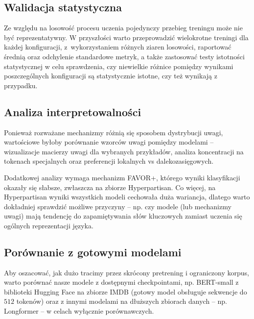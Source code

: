 \documentclass[a4paper,11pt,twoside]{report}
\theoremstyle{definition}
\begin{document}
\subsection{Walidacja statystyczna} 
Ze względu na losowość procesu uczenia pojedynczy przebieg treningu może nie być reprezentatywny. W przyszłości warto przeprowadzić wielokrotne treningi dla każdej konfiguracji, z~wykorzystaniem różnych ziaren losowości, raportować średnią oraz odchylenie standardowe metryk, a także zastosować testy istotności statystycznej w celu sprawdzenia, czy niewielkie różnice pomiędzy wynikami poszczególnych konfiguracji są statystycznie istotne, czy też wynikają z przypadku.

\subsection{Analiza interpretowalności}
Ponieważ rozważane mechanizmy różnią się sposobem dystrybucji uwagi, wartościowe byłoby porównanie wzorców uwagi pomiędzy modelami -- wizualizacje macierzy uwagi dla wybranych przykładów, analiza koncentracji na tokenach specjalnych oraz preferencji lokalnych vs dalekozasięgowych.

Dodatkowej analizy wymaga mechanizm FAVOR+, którego wyniki klasyfikacji okazały się słabsze, zwłaszcza na zbiorze Hyperpartisan. Co więcej, na Hyperpartisan wyniki wszystkich modeli cechowała duża wariancja, dlatego warto dokładniej sprawdzić możliwe przyczyny -- np. czy modele (lub mechanizmy uwagi) mają tendencję do zapamiętywania słów kluczowych zamiast uczenia się ogólnych reprezentacji języka.

\subsection{Porównanie z gotowymi modelami}
Aby oszacować, jak dużo tracimy przez skrócony pretrening i ograniczony korpus, warto porównać nasze modele z dostępnymi checkpointami, np. BERT-small z biblioteki Hugging Face na zbiorze IMDB (gotowy model obsługuje sekwencje do $512$ tokenów) oraz z innymi modelami na dłuższych zbiorach danych -- np. Longformer -- w celach wyłącznie porównawczych.





\end{document}
